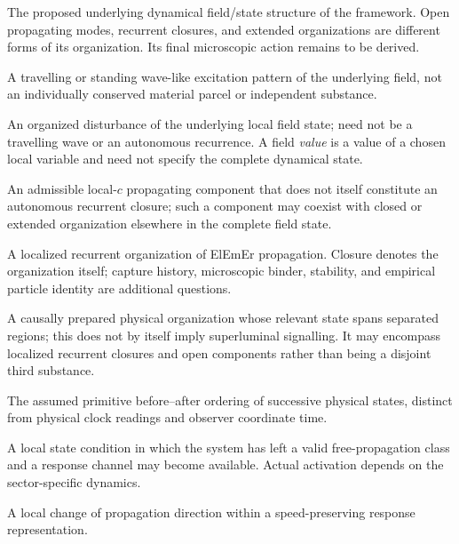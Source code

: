 \documentclass[11pt]{article}
\theoremstyle{definition}
\newcommand{\ElEmEr}{\mbox{ElEmEr}}
\begin{document}
\begin{description}[style=nextline]
\item[Elemental Motion Resonance (ElEmEr)]
The proposed underlying dynamical field/state structure of the framework.  Open
propagating modes, recurrent closures, and extended organizations are different forms of
its organization.  Its final microscopic action remains to be derived.

\item[ElEmEr wave]
A travelling or standing wave-like excitation pattern of the underlying field, not
an individually conserved material parcel or independent substance.

\item[ElEmEr field excitation]
An organized disturbance of the underlying local field state; need not be a travelling
wave or an autonomous recurrence.  A field \emph{value} is a value of a chosen local
variable and need not specify the complete dynamical state.

\item[Open propagating mode]
An admissible local-$c$ propagating component that does not itself constitute an
autonomous recurrent closure; such a component may coexist with closed or extended
organization elsewhere in the complete field state.

\item[Closure]
A localized recurrent organization of \ElEmEr{} propagation.  Closure denotes the
organization itself; capture history, microscopic binder, stability, and empirical
particle identity are additional questions.

\item[Extended organization]
A causally prepared physical organization whose relevant state spans separated regions;
this does not by itself imply superluminal signalling.  It may encompass localized
recurrent closures and open components rather than being a disjoint third substance.

\item[Primitive succession $s$]
The assumed primitive before--after ordering of successive physical states, distinct from
physical clock readings and observer coordinate time.

\item[Interaction opportunity]
A local state condition in which the system has left a valid free-propagation class and
a response channel may become available.  Actual activation depends on the
sector-specific dynamics.

\item[Steering]
A local change of propagation direction within a speed-preserving response
representation.


\end{description}
\end{document}
